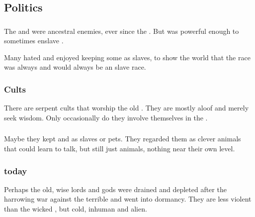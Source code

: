 \subsection{Politics}





\subsubsection{\Aryothim}
The \ophidians and \aryothim were ancestral enemies, ever since the .
But  was powerful enough to sometimes enslave \aryothim. 

Many \ophidians hated \aryothim and enjoyed keeping some \aryothim as slaves, to show the world that the \aryoth race was always and would always be an \ophidian slave race. 





\subsubsection{Cults}
There are serpent cults that worship the old \ophidians. 
They are mostly aloof and merely seek wisdom. 
Only occasionally do they involve themselves in the \feud. 





\subsubsection{\Nephilim}
Maybe they kept \nephilim{} and \meccara{} as slaves or pets. 
They regarded them as clever animals that could learn to talk, but still just animals, nothing near their own level. 





\subsubsection{\Ophidians today}
Perhaps the old, wise \ophidian{} lords and gods were drained and depleted after the harrowing war against the terrible \xzaishanns{} and went into dormancy. 
They are less violent than the wicked \draecchonosh, but cold, inhuman and alien. 

